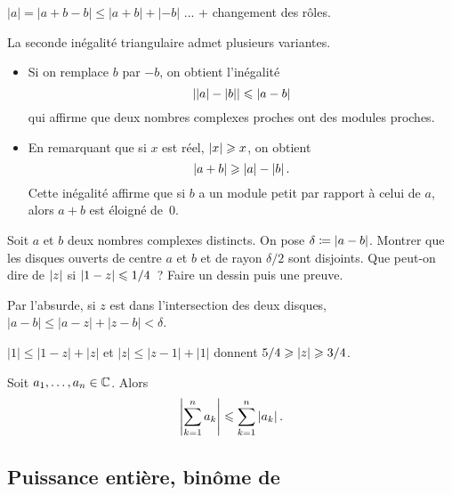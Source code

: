 \documentclass{magnolia}
\begin{document}
\begin{preuve}
$|a|=|a+b-b|\leq |a+b|+|-b|$ ... + changement des rôles.

\end{preuve}

\begin{remarqueUnique}
\remarque La seconde inégalité triangulaire admet plusieurs variantes.
  \begin{itemize}
  \item Si on remplace $b$ par $-b$, on obtient l'inégalité
    \[\left|\left|a\right|-\left|b\right|\right|\leqslant\left|a-b\right|\]
    qui affirme que deux nombres complexes proches ont des modules proches.
  \item En remarquant que si $x$ est réel, $\left|x\right|\geqslant x$, on obtient
    \[\left|a+b\right|\geqslant\left|a\right|-\left|b\right|.\]
    Cette inégalité affirme que si $b$ a un module petit par rapport à celui de $a$, alors $a+b$ est éloigné de~0.
  \end{itemize}
\end{remarqueUnique}

\begin{exos}
\exo Soit $a$ et $b$ deux nombres complexes distincts. On pose $\delta\coloneqq\left|a-b\right|$. Montrer que les disques ouverts de centre $a$ et $b$ et de rayon $\delta/2$ sont disjoints.
\exo Que peut-on dire de $\left|z\right|$ si $\left|1-z\right|\leqslant 1/4$~? Faire un dessin puis une preuve.
\begin{sol}
Par l'absurde, si $z$ est dans l'intersection des deux disques, $|a-b|\leq|a-z|+|z-b|<\delta$.

$|1|\leq |1-z|+|z|$ et $|z|\leq |z-1|+|1|$ donnent $5/4\geqslant \left|z\right|\geqslant 3/4$.
\end{sol}
\end{exos}

\begin{proposition}
Soit $a_1,\ldots,a_n\in\mathbb{C}$. Alors
\[\left|\sum_{k=1}^n a_k\right|\leqslant \sum_{k=1}^n \left|a_k\right|.\]
\end{proposition}


\subsection{Puissance entière, binôme de }
\end{document}
